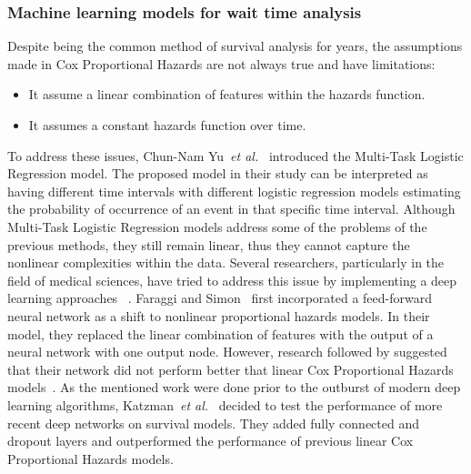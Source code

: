 \subsubsection{Machine learning models for wait time analysis}
Despite being the common method of survival analysis for years, the assumptions made in Cox Proportional Hazards are not always true and have limitations:
\begin{itemize}
    \item It assume a linear combination of features within the hazards function.
    \item It assumes a constant hazards function over time.
\end{itemize}
To address these issues, Chun-Nam Yu~\textit{et al.}~\cite{yu2011learning} introduced the Multi-Task Logistic Regression model. The proposed model in their study can be interpreted as having different time intervals with different logistic regression models estimating the probability of occurrence of an event in that specific time interval. Although Multi-Task Logistic Regression models address some of the problems of the previous methods, they still remain linear, thus they cannot capture the nonlinear complexities within the data. Several researchers, particularly in the field of medical sciences, have tried to address this issue by implementing a deep learning approaches ~\cite{faraggi1995neural,katzman2016deep,luck2017deep}. Faraggi and Simon~ \cite{faraggi1995neural} first incorporated a feed-forward neural network as a shift to nonlinear proportional hazards models. In their model, they replaced the linear combination of features with the output of a neural network with one output node. However, research followed by suggested that their network did not perform better that linear Cox Proportional Hazards models~\cite{mariani1997prognostic}. As the mentioned work were done prior to the outburst of modern deep learning algorithms, Katzman~\textit{et al.}~\cite{katzman2016deep} decided to test the performance of more recent deep networks on survival models. They added fully connected and dropout layers and outperformed the performance of previous linear Cox Proportional Hazards models.

